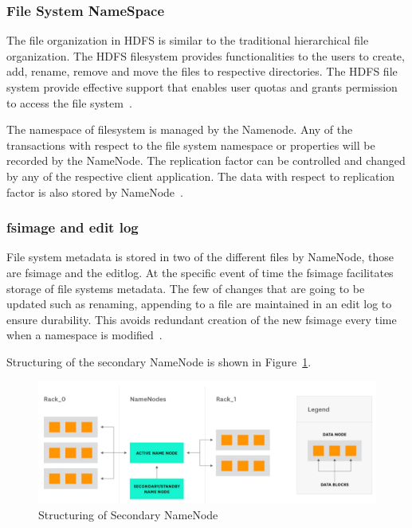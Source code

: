 \subsubsection{File System NameSpace}
The file organization in HDFS is similar to the 
traditional hierarchical file organization. The HDFS 
filesystem provides functionalities to the users to create, 
add, rename, remove and move the files to respective directories. 
The HDFS file system provide effective support that 
enables user quotas and grants  
permission to access the file system~\cite{hid-sp18-412-HDFS-Architecture}. 

The namespace of filesystem is managed by the Namenode. 
Any of the transactions with respect to the file system 
namespace or properties will be recorded by the NameNode. 
The replication factor can be controlled and changed by 
any of the respective client application. The data with 
respect to 
replication factor is also
stored by NameNode~\cite{hid-sp18-412-HDFS-Architecture}.

\subsubsection{fsimage and edit log}
File system metadata is stored in two of the 
different files by NameNode, those are fsimage 
and the editlog. At the specific event of time 
the fsimage facilitates storage of file 
systems metadata. The few of changes that are going 
to be updated such as renaming, appending to a 
file are maintained in an edit log to ensure durability. 
This avoids redundant creation of the
new fsimage every time when a 
namespace is modified~\cite{hid-sp18-412-hadoop-architecture-overview}. 

Structuring of the secondary NameNode is 
shown in Figure~\ref{s:secnode}.

\begin{figure}[!ht]
\centering
\includegraphics[width=\textwidth]{images/StructureOfSecondaryNode.png}
\caption{Structuring of Secondary 
NameNode~\cite{hid-sp18-412-hadoop-architecture-overview}}\label{s:secnode}
\end{figure}

